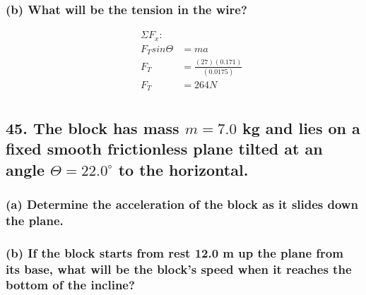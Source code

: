 \documentclass[12pt,a4paper,english]{article}
\begin{document}
\begin{flushleft}
  \subsubsection{(b) What will be the tension in the wire?}
  \begin{align*}
    &&\Sigma F_x:&
    \\
    &&F_Tsin\Theta&=ma
    \\
    &&F_T&=\frac{(27)(0.171)}{(0.0175)}
    \\
    &&F_T&=264N
    \\
  \end{align*}
  \subsection{45. The block has mass $m=7.0$ kg and lies on a fixed smooth frictionless plane tilted at an angle $\Theta=22.0^\circ$ to the horizontal.}
  \subsubsection{(a) Determine the acceleration of the block as it slides down the plane.}
  \subsubsection{(b) If the block starts from rest 12.0 m up the plane from its base, what will be the block's speed when it reaches the bottom of the incline?}
\end{flushleft}
\end{document}
